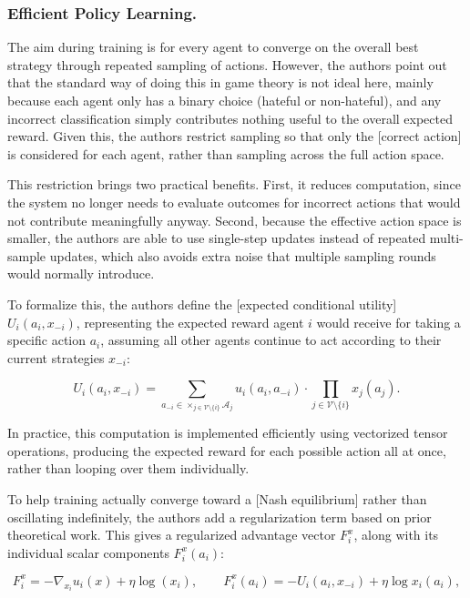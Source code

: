 \documentclass[manuscript,review]{acmart}
\begin{document}
\subsubsection{\textbf{Efficient Policy Learning.} \newline}

The aim during training is for every agent to converge on the overall best strategy
through repeated sampling of actions. However, the authors point out that the standard
way of doing this in game theory is not ideal here, mainly because each agent only has a
binary choice (hateful or non-hateful), and any incorrect classification simply
contributes nothing useful to the overall expected reward. Given this, the authors
restrict sampling so that only the [correct action] is considered for each agent, rather
than sampling across the full action space.

This restriction brings two practical benefits. First, it reduces computation, since the
system no longer needs to evaluate outcomes for incorrect actions that would not
contribute meaningfully anyway. Second, because the effective action space is smaller,
the authors are able to use single-step updates instead of repeated multi-sample
updates, which also avoids extra noise that multiple sampling rounds would normally
introduce.

To formalize this, the authors define the [expected conditional utility] $U_i(a_i,
x_{-i})$, representing the expected reward agent $i$ would receive for taking a specific
action $a_i$, assuming all other agents continue to act according to their current
strategies $x_{-i}$:

\begin{equation}
U_i(a_i, x_{-i}) = \sum_{a_{-i} \in \times_{j \in \mathcal{V}\setminus\{i\}} \mathcal{A}_j} u_i(a_i, a_{-i}) \cdot \prod_{j \in \mathcal{V}\setminus\{i\}} x_j(a_j).
\end{equation}

In practice, this computation is implemented efficiently using vectorized tensor
operations, producing the expected reward for each possible action all at once, rather
than looping over them individually.

To help training actually converge toward a [Nash equilibrium] rather than oscillating
indefinitely, the authors add a regularization term based on prior theoretical work. This
gives a regularized advantage vector $F_i^x$, along with its individual scalar components
$F_i^x(a_i)$:

\begin{equation}
F_i^x = -\nabla_{x_i} u_i(x) + \eta \log(x_i), \qquad
F_i^x(a_i) = -U_i(a_i, x_{-i}) + \eta \log x_i(a_i),
\end{equation}
\end{document}
